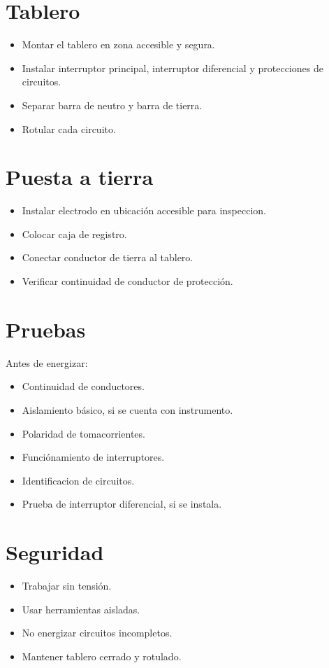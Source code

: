 \section{Tablero}

\begin{itemize}
  \item Montar el tablero en zona accesible y segura.
  \item Instalar interruptor principal, interruptor diferencial y protecciones de circuitos.
  \item Separar barra de neutro y barra de tierra.
  \item Rotular cada circuito.
\end{itemize}

\section{Puesta a tierra}

\begin{itemize}
  \item Instalar electrodo en ubicación accesible para inspeccion.
  \item Colocar caja de registro.
  \item Conectar conductor de tierra al tablero.
  \item Verificar continuidad de conductor de protección.
\end{itemize}

\section{Pruebas}

Antes de energizar:

\begin{itemize}
  \item Continuidad de conductores.
  \item Aislamiento básico, si se cuenta con instrumento.
  \item Polaridad de tomacorrientes.
  \item Funciónamiento de interruptores.
  \item Identificacion de circuitos.
  \item Prueba de interruptor diferencial, si se instala.
\end{itemize}

\section{Seguridad}

\begin{itemize}
  \item Trabajar sin tensión.
  \item Usar herramientas aisladas.
  \item No energizar circuitos incompletos.
  \item Mantener tablero cerrado y rotulado.
\end{itemize}

